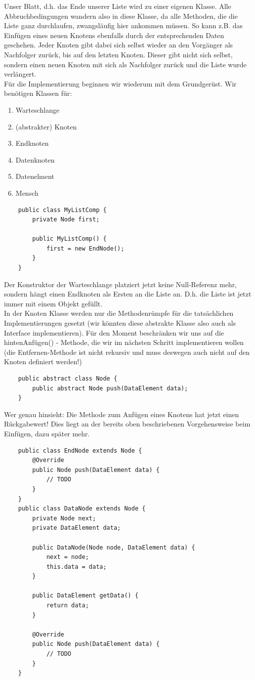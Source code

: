 \documentclass{article}
\begin{document}
Unser Blatt, d.h. das Ende unserer Liste wird zu einer eigenen Klasse. Alle Abbruchbedingungen wandern also in diese Klasse, da alle Methoden, die die Liste ganz durchlaufen, zwangsläufig hier ankommen müssen. So kann z.B. das Einfügen eines neuen Knotens ebenfalls durch  der entsprechenden Daten geschehen. Jeder Knoten gibt dabei sich selbst wieder an den Vorgänger als Nachfolger zurück, bis auf den letzten Knoten. Dieser gibt nicht sich selbst, sondern einen neuen Knoten mit sich als Nachfolger zurück und die Liste wurde verlängert. \\
Für die Implementierung beginnen wir wiederum mit dem Grundgerüst. Wir benötigen Klassen für:
\begin{enumerate}
    \item Warteschlange
    \item (abstrakter) Knoten 
    \item Endknoten
    \item Datenknoten
    \item Datenelment
    \item Mensch
\end{enumerate}
\begin{verbatim}
    public class MyListComp {
        private Node first;

        public MyListComp() {
            first = new EndNode();
        }
    }
\end{verbatim}
Der Konstruktor der Warteschlange platziert jetzt keine Null-Referenz mehr, sondern hängt einen Endknoten als Ersten an die Liste an. D.h. die Liste ist jetzt immer mit einem  Objekt gefüllt. \\ 
In der Knoten Klasse werden nur die Methodenrümpfe für die tatsächlichen Implementierungen gesetzt (wir könnten diese abstrakte Klasse also auch als Interface implementieren). Für den Moment beschränken wir uns auf die hintenAnfügen() - Methode, die wir im nächsten Schritt implementieren wollen (die Entfernen-Methode ist nicht rekursiv und muss deswegen auch nicht auf den Knoten definiert werden!)
\begin{verbatim}
    public abstract class Node {
        public abstract Node push(DataElement data);
    }
\end{verbatim}
Wer genau hinsieht: Die Methode zum Anfügen eines Knotens hat jetzt einen Rückgabewert! Dies liegt an der bereits oben beschriebenen Vorgehensweise beim Einfügen, dazu später mehr. \\
\begin{verbatim}
    public class EndNode extends Node {
        @Override
        public Node push(DataElement data) {
            // TODO
        }
    }
    public class DataNode extends Node {
        private Node next;
        private DataElement data;

        public DataNode(Node node, DataElement data) {
            next = node;
            this.data = data;
        }

        public DataElement getData() {
            return data;
        }

        @Override
        public Node push(DataElement data) {
            // TODO
        }
    }
\end{verbatim}
\end{document}
